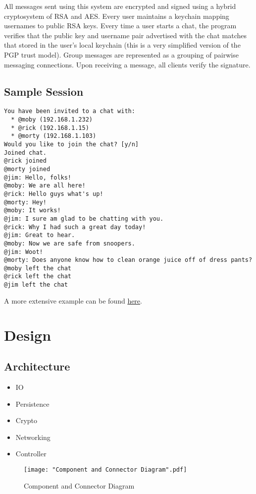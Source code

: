 \documentclass{scrartcl}
\begin{document}
All messages sent using this system are encrypted and signed using a hybrid cryptosystem of RSA and AES. Every user maintains a keychain mapping usernames to public RSA keys. Every time a user starts a chat, the program verifies that the public key and username pair advertised with the chat matches that stored in the user's local keychain (this is a very simplified version of the PGP trust model). Group messages are represented as a grouping of pairwise messaging connections. Upon receiving a message, all clients verify the signature.

\subsection{Sample Session}
\begin{lstlisting}
You have been invited to a chat with:
  * @moby (192.168.1.232)
  * @rick (192.168.1.15)
  * @morty (192.168.1.103)
Would you like to join the chat? [y/n]
Joined chat.
@rick joined
@morty joined
@jim: Hello, folks!
@moby: We are all here!
@rick: Hello guys what's up!
@morty: Hey!
@moby: It works!
@jim: I sure am glad to be chatting with you.
@rick: Why I had such a great day today!
@jim: Great to hear.
@moby: Now we are safe from snoopers.
@jim: Woot!
@morty: Does anyone know how to clean orange juice off of dress pants?
@moby left the chat
@rick left the chat
@jim left the chat
\end{lstlisting}

A more extensive example can be found  \href{https://asciinema.org/a/e9isbc0pb8ww5i36jjpck3dz6}{here}.\\

\section{Design}
\subsection{Architecture}
\begin{itemize}
	\item IO
	\item Persistence
	\item Crypto
	\item Networking
	\item Controller
\end{itemize}

\begin{figure}[H]
	\texttt{[image: "Component and Connector Diagram".pdf]}
	\caption{Component and Connector Diagram}
\end{figure}
\end{document}
